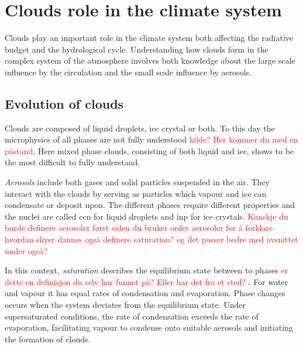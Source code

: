 \section{Clouds role in the climate system} \label{sec:cloud_in_climate_system}
Clouds play an important role in the climate system both affecting the radiative budget and the hydrological cycle. Understanding how clouds form in the complex system of the atmosphere involves both knowledge about the large scale influence by the circulation and the small scale influence by aerosols. 
\subsection{Evolution of clouds}
Clouds are composed of liquid droplets, ice crystal or both. To this day the microphysics of all phases are not fully understood \textcolor{red}{kilde? Her kommer du med en påstand}. Here mixed phase clouds, consisting of both liquid and ice, shows to be the most difficult to fully understand. 

\textit{Aerosols} include both gases and solid particles suspended in the air. They interact with the clouds by serving as particles which vapour and ice can condensate or deposit upon. The different phases require different properties and the nuclei are called \acrfull{ccn} for liquid droplets and \acrfull{inp} for ice crystals. 
\textcolor{red}{Kanskje du burde definere aerosoler først siden du bruker order aerosoler for å forklare hvordan skyer dannes også definere saturation? og det passer bedre med avsnittet under også?}



In this context, \textit{saturation} describes the equilibrium state between to phases \textcolor{red}{er dette en definisjon du selv har funnet på? Eller har det fra et sted? }. For water and vapour it has equal rates of condensation and evaporation. Phase changes occurs when the system deviates from the equilibrium state. Under supersaturated conditions, the rate of condensation exceeds the rate of evaporation, facilitating vapour to condense onto suitable aerosols and initiating the formation of clouds. 

